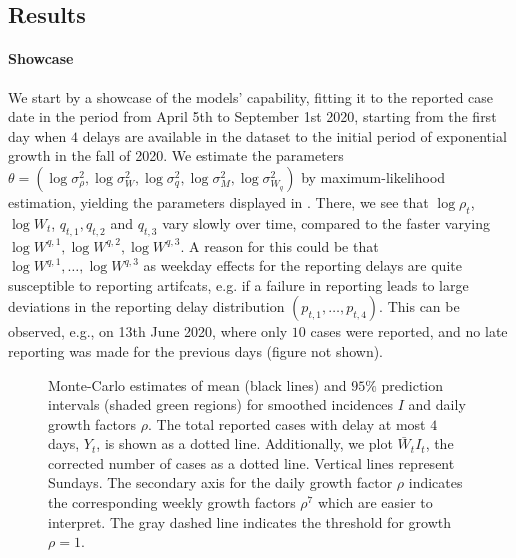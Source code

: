 \subsection{Results}
\paragraph{Showcase}
We start by a showcase of the models' capability, fitting it to the reported case date in the period from April 5th to September 1st 2020, starting from the first day when $4$ delays are available in the dataset to the initial period of exponential growth in the fall of 2020. We estimate the parameters $\theta = \left( \log \sigma^{2}_{\rho}, \log \sigma^{2}_W, \log \sigma^{2}_q, \log \sigma^{2}_M, \log \sigma^{2}_{W_{q}}\right)$ by maximum-likelihood estimation, yielding the parameters displayed in . There, we see that $\log \rho_{t}$, $\log W_{t}$, $q_{t,1}, q_{t,2}$ and $ q_{t,3}$ vary slowly over time, compared to the faster varying $\log W^{q, 1}, \log W^{q,2}, \log W^{q,3}$. A reason for this could be that $\log W^{q,1}, \dots, \log W^{q,3}$ as weekday effects for the reporting delays are quite susceptible to reporting artifcats, e.g. if a failure in reporting leads to large deviations in the reporting delay distribution $(p_{t,1}, \dots, p_{t,4})$. This can be observed, e.g., on 13th June 2020, where only $10$ cases were reported, and no late reporting was made for the previous days (figure not shown).

\begin{table}
    \centering
    
    \caption{Standard deviations for the models' showcase determined either by hand, by the initial search or by maximum likelihood estimation described in . 
    The parameter values chosen by hand are based on a combination of informed guesses (magnitude of standard deviations based on realistic change over time) as well as manual exploration (fitting the same model for smaller time-periods) before setting up the initial search / maximum likelihood estimation. 
    The difference between the initial search and the \gls{mle} is negligible and is not visible for the precision shown here.}
    \label{tab:showcase-parameters}
\end{table}
\begin{figure}
    \resizebox{\textwidth}{!}{%
    }
    \caption{Monte-Carlo estimates of mean (black lines) and $95\%$ prediction intervals (shaded green regions) for smoothed incidences $I$ and daily growth factors $\rho$. The total reported cases with delay at most $4$ days,  $Y_{t}$, is shown as a dotted line. Additionally, we plot $\bar W_{t}I_{t}$, the corrected number of cases as a dotted line. Vertical lines represent Sundays. The secondary axis for the daily growth factor $\rho$ indicates the corresponding weekly growth factors $\rho^{7}$ which are easier to interpret. The gray dashed line indicates the threshold for growth $\rho = 1$.}
    \label{fig:showcase_prediction_intervals_I_rho}
\end{figure}

